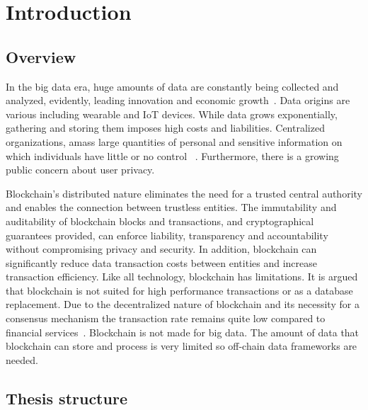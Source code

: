 \chapter{Introduction}
\label{introduction}

\section{Overview}
\label{introduction:overview}

In the big data era, huge amounts of data are constantly being collected and analyzed, evidently, leading innovation and
economic growth~\cite{10.1109/SPW.2015.27}. Data origins are various including wearable and IoT devices.
While data grows exponentially, gathering and storing them imposes high costs and liabilities.
Centralized organizations, amass large quantities of personal and sensitive information on which individuals have little or no control ~\cite{10.1109/SPW.2015.27}.
Furthermore, there is a growing public concern about user privacy.

Blockchain’s distributed nature eliminates the need for a trusted central authority and enables the connection between trustless entities.
The immutability and auditability of blockchain blocks and transactions, and cryptographical guarantees provided, can enforce liability, transparency and accountability without compromising privacy and security.
In addition, blockchain can significantly reduce data transaction costs between entities and increase transaction efficiency.
Like all technology, blockchain has limitations. It is argued that blockchain is not suited for high performance transactions or as a database replacement.
Due to the decentralized nature of blockchain and its necessity for a consensus mechanism the transaction rate remains quite low compared to financial services~\cite{Sompolinsky2015,Zohar:2015:BUH:2817191.2701411}.
Blockchain is not made for big data. The amount of data that blockchain can store and process is very limited so off-chain data frameworks are needed.

\section{Thesis structure}
\label{introduction:structure}
